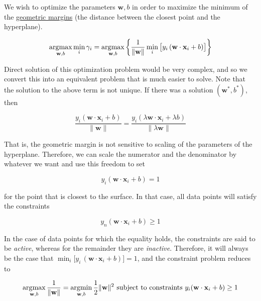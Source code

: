   We wish to optimize the parameters $\mathbf{w}, b$ in order to maximize the minimum of the \hyperref[def:geometric-margin]{geometric margins} (the distance between the closest point and the hyperplane). 

  \begin{equation}
    \operatorname*{\arg\!\max}_{\mathbf{w}, b} \min_i \gamma_i = \operatorname*{\arg\!\max}_{\mathbf{w}, b} \bigg\{ \frac{1}{\|\mathbf{w}\|} \min_i \big[y_i \, (\mathbf{w} \cdot \mathbf{x}_i + b) \big] \bigg\}
  \end{equation}

  Direct solution of this optimization problem would be very complex, and so we convert this into an equivalent problem that is much easier to solve. Note that the solution to the above term is not unique. If there was a solution $(\mathbf{w}^\ast, b^\ast)$, then 

  \begin{equation}
    \frac{y_i (\mathbf{w} \cdot \mathbf{x}_i + b)}{\|\mathbf{w}\|} = \frac{y_i (\lambda \mathbf{w} \cdot \mathbf{x}_i + \lambda b)}{\|\lambda \mathbf{w}\|}  
  \end{equation}

  That is, the geometric margin is not sensitive to scaling of the parameters of the hyperplane. Therefore, we can scale the numerator and the denominator by whatever we want and use this freedom to set 

  \begin{equation*}
    y_i ( \mathbf{w} \cdot \mathbf{x}_i + b ) = 1 
  \end{equation*}
  
  for the point that is closest to the surface. In that case, all data points will satisfy the constraints 

  \begin{equation*}
    y_n (\mathbf{w} \cdot \mathbf{x}_i + b) \geq 1
  \end{equation*}

  In the case of data points for which the equality holds, the constraints are said to be \textit{active}, whereas for the remainder they are \textit{inactive}. Therefore, it will always be the case that $\min_i \big[ y_i \, (\mathbf{w} \cdot \mathbf{x}_i + b)\big] = 1$, and the constraint problem reduces to 

  \begin{equation}
    \operatorname*{\arg\!\max}_{\mathbf{w}, b} \frac{1}{\|\mathbf{w}\|} = \operatorname*{\arg\!\min}_{\mathbf{w}, b} \frac{1}{2} \|\mathbf{w}\|^2 \text{ subject to constraints } y_i (\mathbf{w} \cdot \mathbf{x}_i + b) \geq 1 
  \end{equation}

